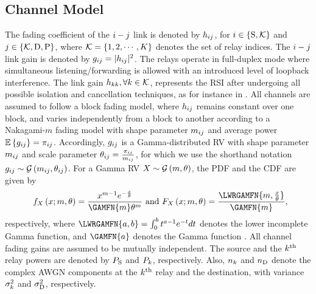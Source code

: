 \documentclass[10pt,journal]{IEEEtran}
\begin{document}
\subsection{Channel Model}\label{subsec:chan_model}
The fading coefficient of the $i - j$ link is denoted by $h_{ij}$, for $i \in\{{\rm S},{\mathcal{K}}\}$ and $j \in\{{\mathcal{K}},{\rm D},{\rm P}\}$, where ${\mathcal{K}}=\{1,2,\cdots,K\}$ denotes the set of relay indices. The $i - j$ link gain is denoted by $g_{ij}= \vert h_{ij} \vert ^2$. The relays operate in full-duplex mode where simultaneous listening/forwarding is allowed with an introduced level of loopback interference. The link gain $h_{kk}, \forall k \in {\mathcal{K}}$, represents the \ac{RSI} after undergoing all possible isolation and cancellation techniques, as for instance in \cite{riihonen201109TWC}. All channels are assumed to follow a block fading model, where $h_{ij}$ remains constant over one block, and varies independently from a block to another according to a Nakagami-$m$ fading model with shape parameter ${m_{ij}}$ and average power $\mathbb{E}\left\{g_{ij}\right\}={\pi_{ij}}$. Accordingly, $g_{ij}$ is a Gamma-distributed \ac{RV} with shape parameter ${m_{ij}}$ and scale parameter ${\theta_{ij}}=\frac{{\pi_{ij}}}{{m_{ij}}}$, for which we use the shorthand notation $g_{ij} \sim \mathcal{G}\left({m_{ij}},{\theta_{ij}}\right)$. For a Gamma \ac{RV} $X \sim \mathcal{G}\left(m,\theta\right)$, the \ac{PDF} and the \ac{CDF} are given by
\begin{eqnarray}
\!\!\!f_{\RV}\left(\RVval;m,\theta\right) = \frac{\RVval^{m-1}e^{-\frac{\RVval}{\theta}}}{\GAMFN{m}\theta^m} \text{ and }
F_{\RV}\left(\RVval;m,\theta\right) = \frac{\LWRGAMFN{m,\frac{\RVval}{\theta}}}{\GAMFN{m}}
\label{eq:gamma_cdf},\!\!\!\!\!\!
\end{eqnarray}
\noindent respectively, where $\LWRGAMFN{a,b}=\int_0^b t^{a-1}e^{-t}dt$ denotes the lower incomplete Gamma function, and $\GAMFN{a}$ denotes the Gamma function \cite{abramowitz_stegun}. All channel fading gains are assumed to be mutually independent. The source and the $k^{\rm th}$ relay powers are denoted by $P_{{\rm S}}$ and $P_{k}$, respectively. Also, $n_k$ and $n_{{\rm D}}$ denote the complex \ac{AWGN} components at the $k^{\rm th}$ relay and the destination, with variance $\sigma_{k}^2$ and $\sigma_{{\rm D}}^2$, respectively.
\end{document}
